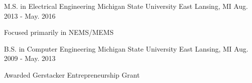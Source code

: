 

\begin{cventries}

  \cventry
    {M.S. in Electrical Engineering} %
    {Michigan State University} %
    {East Lansing, MI} %
    {Aug. 2013 - May. 2016} %
    {
      \begin{cvitems} %
        \item {Focused primarily in NEMS/MEMS}
      \end{cvitems}
    }

  \cventry
    {B.S. in Computer Engineering} %
    {Michigan State University} %
    {East Lansing, MI} %
    {Aug. 2009 - May. 2013} %
    {
      \begin{cvitems} %
        \item {Awarded Gerstacker Entrepreneurship Grant}
      \end{cvitems}
    }

\end{cventries}
